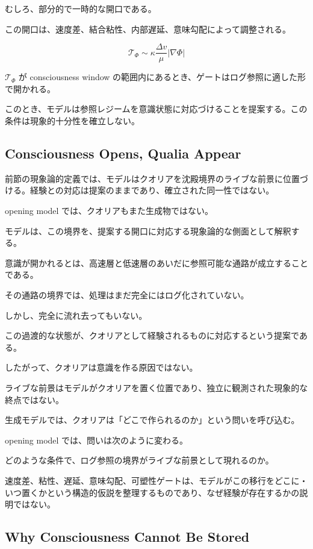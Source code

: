 むしろ、部分的で一時的な開口である。

この開口は、速度差、結合粘性、内部遅延、意味勾配によって調整される。

\begin{equation}
\mathcal{T}_{\Phi}
\sim
\kappa
\frac{\Delta v}{\mu}
|\nabla \Phi|
\end{equation}

$\mathcal{T}_{\Phi}$ が consciousness window の範囲内にあるとき、ゲートはログ参照に適した形で開かれる。

このとき、モデルは参照レジームを意識状態に対応づけることを提案する。この条件は現象的十分性を確立しない。

\subsection{Consciousness Opens, Qualia Appear}

前節の現象論的定義では、モデルはクオリアを沈殿境界のライブな前景に位置づける。経験との対応は提案のままであり、確立された同一性ではない。

opening model では、クオリアもまた生成物ではない。

モデルは、この境界を、提案する開口に対応する現象論的な側面として解釈する。

意識が開かれるとは、高速層と低速層のあいだに参照可能な通路が成立することである。

その通路の境界では、処理はまだ完全にはログ化されていない。

しかし、完全に流れ去ってもいない。

この過渡的な状態が、クオリアとして経験されるものに対応するという提案である。

したがって、クオリアは意識を作る原因ではない。

ライブな前景はモデルがクオリアを置く位置であり、独立に観測された現象的な終点ではない。

生成モデルでは、クオリアは「どこで作られるのか」という問いを呼び込む。

opening model では、問いは次のように変わる。

どのような条件で、ログ参照の境界がライブな前景として現れるのか。

速度差、粘性、遅延、意味勾配、可塑性ゲートは、モデルがこの移行をどこに・いつ置くかという構造的仮説を整理するものであり、なぜ経験が存在するかの説明ではない。

\subsection{Why Consciousness Cannot Be Stored}

